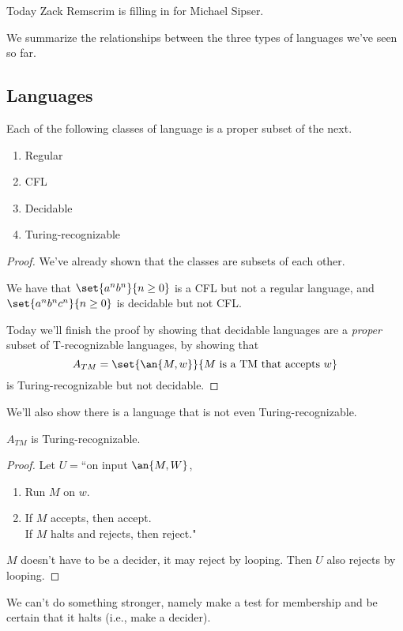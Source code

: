 
Today Zack Remscrim is filling in for Michael Sipser.

We summarize the relationships between the three types of languages we've seen so far.
\subsection{Languages}
\begin{pr}
Each of the following classes of language is a proper subset of the next.
\begin{enumerate}
\item
Regular
\item
CFL
\item
Decidable
\item
Turing-recognizable
\end{enumerate}
\end{pr}
\begin{proof}
We've already shown that the classes are subsets of each other.

We have that $\set{a^nb^n}{n\ge 0}$ is a CFL but not a regular language, and $\set{a^nb^nc^n}{n\ge 0}$ is decidable but not CFL.

Today we'll finish the proof by showing that decidable languages are a {\it proper} subset of T-recognizable languages, by showing that
\[
A_{TM}=\set{\an{M,w}}{M\text{ is a TM that accepts }w}
\]
is Turing-recognizable but not decidable.
\end{proof}

We'll also show there is a language that is not even Turing-recognizable.

\begin{thm}
$A_{TM}$ is Turing-recognizable.
\end{thm}
\begin{proof}
Let $U=$``on input $\an{M,W}$,
\begin{enumerate}
\item
Run $M$ on $w$.
\item If $M$ accepts, then accept.\\
If $M$ halts and rejects, then reject."
\end{enumerate}
$M$ doesn't have to be a decider, it may reject by looping. Then $U$ also rejects by looping.
\end{proof}

We can't do something stronger, namely make a test for membership and be certain that it halts (i.e., make a decider).
